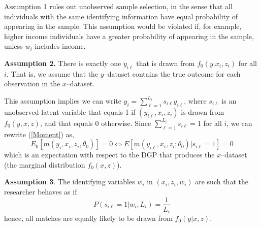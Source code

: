 \documentclass[12pt]{article}
\begin{document}
Assumption 1 rules out unobserved sample selection, in the sense that all individuals with the same identifying information have equal probability of appearing in the sample.  This assumption would be violated if, for example, higher income individuals have a greater probability of appearing in the sample, unless $w_i$ includes income.   

\textbf{Assumption 2.}  There is exactly one $y_{i\ell}$ that is drawn from $f_0(y | x_i,z_i)$%
for all $i.$ That is, we assume that the  $y$--dataset contains the true outcome for each observation in the $x$--dataset. 

This assumption implies we can write $y_i = \sum_{\ell=1}^{L_i} s_{i\ell} y_{i\ell}$, where%
 $s_{i\ell}$ is an unobserved latent variable that equals 1 if $(y_{i\ell}, x_i, z_i) $ is drawn from $f_0(y,x,z)$, and that equals 0 otherwise.  
Since $\sum_{\ell=1}^{L_i} s_{i\ell} = 1$ for all $i$, we can rewrite (\ref{Moment}) as,
\begin{equation} E_0\left[m(y_i, x_i, z_i, \theta_0 )\right] = 0 \iff %
E\left[m(y_{i\ell},x_i,z_i; \theta_0) | s_{i\ell} =1 \right] = 0  \label{truemodel} \end{equation} 
which is an expectation with respect to the DGP that produces the $x$--dataset (the marginal distribution $f_0(x,z)$). 

\textbf{Assumption 3}. The identifying variables $w_i$ in $(x_i, z_i, w_i)$ are such that the researcher behaves as if
$$P(s_{i\ell}=1 | w_i, L_i) = \frac{1}{L_i}$$ 
hence, all matches are equally likely to be drawn from $f_0(y | x,z)$. 
\end{document}
